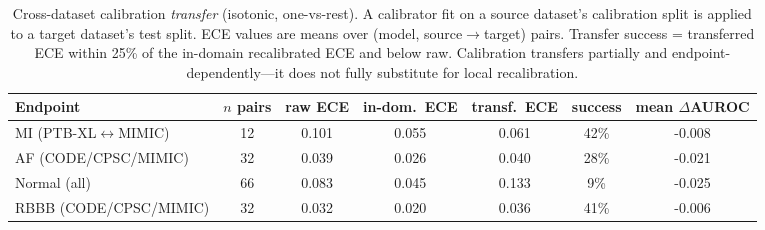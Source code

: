 \begin{table}[t]
\centering
\caption{Cross-dataset calibration \emph{transfer} (isotonic, one-vs-rest). A calibrator fit on a source dataset's calibration split is applied to a target dataset's test split. ECE values are means over (model, source$\to$target) pairs. Transfer success = transferred ECE within 25\% of the in-domain recalibrated ECE and below raw. Calibration transfers partially and endpoint-dependently---it does not fully substitute for local recalibration.}
\label{tab:transfer}
\small
\begin{tabular}{lcccccc}
\toprule
Endpoint & $n$ pairs & raw ECE & in-dom.\ ECE & transf.\ ECE & success & mean $\Delta$AUROC \\
\midrule
  MI (PTB-XL$\leftrightarrow$MIMIC) & 12 & 0.101 & 0.055 & 0.061 & 42\% & -0.008 \\
  AF (CODE/CPSC/MIMIC) & 32 & 0.039 & 0.026 & 0.040 & 28\% & -0.021 \\
  Normal (all) & 66 & 0.083 & 0.045 & 0.133 & 9\% & -0.025 \\
  RBBB (CODE/CPSC/MIMIC) & 32 & 0.032 & 0.020 & 0.036 & 41\% & -0.006 \\
\bottomrule
\end{tabular}
\end{table}